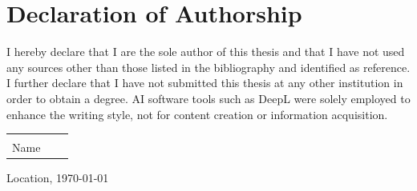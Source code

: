 \chapter{Declaration of Authorship}
I hereby declare that I are the sole author of this thesis and that I have not used any sources other than those listed in the bibliography and identified as reference.
I further declare that I have not submitted this thesis at any other institution in order to obtain a degree.
AI software tools such as DeepL were solely employed to enhance the writing style, not for content creation or information acquisition.

\vspace{70pt}
\begin{flushleft}
    \begin{tabularx}{\textwidth}{@{}m{7cm}Xm{7cm}@{}}
        \vskip 2cm \hrulefill & & \\
        Name & & \\
    \end{tabularx}
\end{flushleft}

\bigskip
Location, \today
